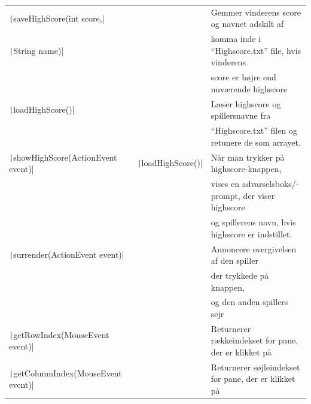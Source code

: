 \begin{table}[H]
\begin{tabular}{lll}
        \texttt|saveHighScore(int score,|         &                                    & Gemmer vinderens score og navnet adskilt af               \\
        \quad \texttt|String name)|               &                                    & komma inde i ``Highscore.txt'' file, hvis vinderens       \\
                                                            &                                    & score er højre end nuværende highscore                    \\
        \texttt|loadHighScore()|                  &                                    & Læser highscore og spillersnavne fra                      \\
                                                            &                                    & ``Highscore.txt'' filen og retunere de som arrayet.       \\
        \texttt|showHighScore(ActionEvent event)| & \texttt|loadHighScore()| & Når man trykker på highscore-knappen,                     \\
                                                            &                                    & vises en advarselsboks/-prompt, der viser highscore       \\
                                                            &                                    & og spillerens navn, hvis highscore er indstillet.         \\
        \texttt|surrender(ActionEvent event)|     &                                    & Annoncere overgivelsen af den spiller                     \\
                                                            &                                    & der trykkede på knappen,                                  \\
                                                            &                                    & og den anden spillers sejr                                \\
        \texttt|getRowIndex(MouseEvent event)|    &                                    & Returnerer rækkeindekset for pane, der er klikket på      \\
        \texttt|getColumnIndex(MouseEvent event)| &                                    & Returnerer søjleindekset for pane, der er klikket på      \\

\end{tabular}
\end{table}
